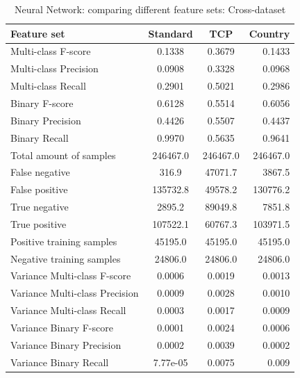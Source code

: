 \begin{table}[H]
\caption{Neural Network: comparing different feature sets: Cross-dataset}
\label{tab:neural:cross}
\centering
\begin{tabular}{l c c r}
\toprule
Feature set & Standard & TCP & Country \\
\midrule
Multi-class F-score & 0.1338 & 0.3679 & 0.1433 \\
Multi-class Precision & 0.0908 & 0.3328 & 0.0968 \\
Multi-class Recall & 0.2901 & 0.5021 & 0.2986 \\
\midrule
Binary F-score & 0.6128 & 0.5514 & 0.6056 \\
Binary Precision & 0.4426 & 0.5507 & 0.4437 \\
Binary Recall & 0.9970 & 0.5635 & 0.9641 \\
\midrule
Total amount of samples & 246467.0 & 246467.0 & 246467.0 \\
False negative & 316.9 & 47071.7 & 3867.5 \\
False positive & 135732.8 & 49578.2 & 130776.2 \\
True negative & 2895.2 & 89049.8 & 7851.8 \\
True positive & 107522.1 & 60767.3 & 103971.5 \\
\midrule
Positive training samples & 45195.0 & 45195.0 & 45195.0\\
Negative training samples & 24806.0 & 24806.0 & 24806.0\\
\midrule
Variance Multi-class F-score & 0.0006 & 0.0019 & 0.0013 \\
Variance Multi-class Precision & 0.0009 & 0.0028 & 0.0010 \\
Variance Multi-class Recall & 0.0003 & 0.0017 & 0.0009  \\
\midrule
Variance Binary F-score & 0.0001 & 0.0024 & 0.0006 \\
Variance Binary Precision & 0.0002 & 0.0039 & 0.0002 \\
Variance Binary Recall & 7.77e-05 & 0.0075 & 0.009 \\
\bottomrule
\end{tabular}
\end{table}

\newpage
